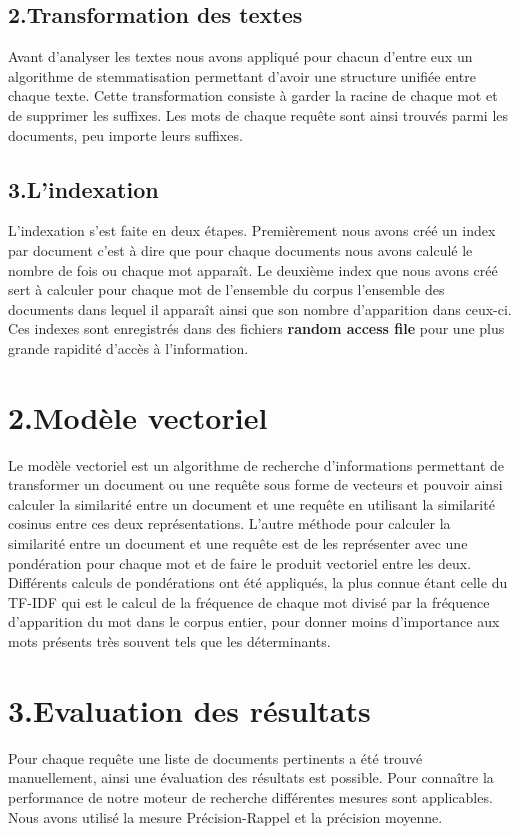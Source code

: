 \documentclass[a4paper,11pt]{report}
\begin{document}
\subsection*{2.Transformation des textes}
Avant d'analyser les textes nous avons appliqué pour chacun d'entre eux un algorithme de stemmatisation permettant d'avoir une structure unifiée entre chaque texte. Cette transformation consiste à garder la racine de chaque mot et de supprimer les suffixes. Les mots de chaque requête sont ainsi trouvés parmi les documents, peu importe leurs suffixes.
\subsection*{3.L'indexation}

L'indexation s'est faite en deux étapes. Premièrement nous avons créé un index par document c'est à dire que pour chaque documents nous avons calculé le nombre de fois ou chaque mot apparaît. Le deuxième index que nous avons créé sert à calculer pour chaque mot de l'ensemble du corpus l'ensemble des documents dans lequel il apparaît ainsi que son nombre d'apparition dans ceux-ci. Ces indexes sont enregistrés dans des fichiers \textbf{random access file} pour une plus grande rapidité d'accès à l'information.

\section*{2.Modèle vectoriel}

Le modèle vectoriel est un algorithme de recherche d'informations permettant de transformer un document ou une requête sous forme de vecteurs et pouvoir ainsi calculer la similarité entre un document et une requête en utilisant la similarité cosinus entre ces deux représentations. L'autre méthode pour calculer la similarité entre un document et une requête est de les représenter avec une pondération pour chaque mot et de faire le produit vectoriel entre les deux. Différents calculs de pondérations ont été appliqués, la plus connue étant celle du TF-IDF qui est le calcul de la fréquence de chaque mot divisé par la fréquence d'apparition du mot dans le corpus entier, pour donner moins d'importance aux mots présents très souvent tels que les déterminants. 



\section*{3.Evaluation des résultats}
Pour chaque requête une liste de documents pertinents a été trouvé manuellement, ainsi une évaluation des résultats est possible. Pour connaître la performance de notre moteur de recherche différentes mesures sont applicables. Nous avons utilisé la mesure Précision-Rappel et la précision moyenne.
\end{document}
